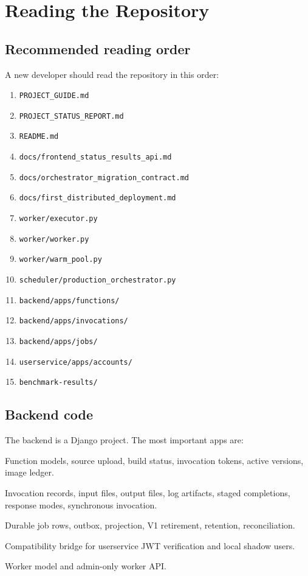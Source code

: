 \documentclass[12pt,a4paper]{report}
\newcommand{\file}[1]{\texttt{#1}}
\begin{document}
\clearpage

\chapter{Reading the Repository}

\section{Recommended reading order}

A new developer should read the repository in this order:

\begin{enumerate}[leftmargin=1.2cm]
  \item \file{PROJECT\_GUIDE.md}
  \item \file{PROJECT\_STATUS\_REPORT.md}
  \item \file{README.md}
  \item \file{docs/frontend\_status\_results\_api.md}
  \item \file{docs/orchestrator\_migration\_contract.md}
  \item \file{docs/first\_distributed\_deployment.md}
  \item \file{worker/executor.py}
  \item \file{worker/worker.py}
  \item \file{worker/warm\_pool.py}
  \item \file{scheduler/production\_orchestrator.py}
  \item \file{backend/apps/functions/}
  \item \file{backend/apps/invocations/}
  \item \file{backend/apps/jobs/}
  \item \file{userservice/apps/accounts/}
  \item \file{benchmark-results/}
\end{enumerate}

\section{Backend code}

The backend is a Django project. The most important apps are:

\begin{description}[leftmargin=3.8cm,style=nextline]
  \item[\file{apps/functions}] Function models, source upload, build status, invocation tokens, active versions, image ledger.
  \item[\file{apps/invocations}] Invocation records, input files, output files, log artifacts, staged completions, response modes, synchronous invocation.
  \item[\file{apps/jobs}] Durable job rows, outbox, projection, V1 retirement, retention, reconciliation.
  \item[\file{apps/accounts}] Compatibility bridge for userservice JWT verification and local shadow users.
  \item[\file{apps/workers}] Worker model and admin-only worker API.
\end{description}
\end{document}
